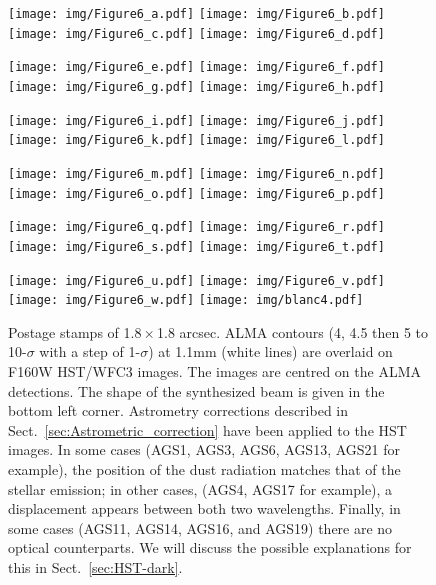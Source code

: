 \documentclass[longauth]{aa}
\begin{document}
\begin{figure*}
\centering

\begin{minipage}[t]{0.9\textwidth}
\resizebox{\hsize}{!} {
\texttt{[image: img/Figure6\_a.pdf]}
\texttt{[image: img/Figure6\_b.pdf]}
\texttt{[image: img/Figure6\_c.pdf]}
\texttt{[image: img/Figure6\_d.pdf]}
}
\end{minipage}
\begin{minipage}[t]{0.9\textwidth}
\resizebox{\hsize}{!} {
\texttt{[image: img/Figure6\_e.pdf]}
\texttt{[image: img/Figure6\_f.pdf]}
\texttt{[image: img/Figure6\_g.pdf]}
\texttt{[image: img/Figure6\_h.pdf]}
}
\end{minipage}

\begin{minipage}[t]{0.9\textwidth}
\resizebox{\hsize}{!} {
\texttt{[image: img/Figure6\_i.pdf]}
\texttt{[image: img/Figure6\_j.pdf]}
\texttt{[image: img/Figure6\_k.pdf]}
\texttt{[image: img/Figure6\_l.pdf]}
}
\end{minipage}
\begin{minipage}[t]{0.9\textwidth}
\resizebox{\hsize}{!} {
\texttt{[image: img/Figure6\_m.pdf]}
\texttt{[image: img/Figure6\_n.pdf]}
\texttt{[image: img/Figure6\_o.pdf]}
\texttt{[image: img/Figure6\_p.pdf]}
}
\end{minipage}
\begin{minipage}[t]{0.9\textwidth}
\resizebox{\hsize}{!} {
\texttt{[image: img/Figure6\_q.pdf]}
\texttt{[image: img/Figure6\_r.pdf]}
\texttt{[image: img/Figure6\_s.pdf]}
\texttt{[image: img/Figure6\_t.pdf]}
}
\end{minipage}
\begin{minipage}[t]{0.9\textwidth}
\resizebox{\hsize}{!} {

\texttt{[image: img/Figure6\_u.pdf]}
\texttt{[image: img/Figure6\_v.pdf]}
\texttt{[image: img/Figure6\_w.pdf]}
\texttt{[image: img/blanc4.pdf]}
}
\end{minipage}
\caption{Postage stamps of 1.8\,$\times$\,1.8 arcsec. ALMA contours (4, 4.5 then 5 to 10-$\sigma$ with a step of 1-$\sigma$) at 1.1mm (white lines) are overlaid on F160W HST/WFC3 images. The images are centred on the ALMA detections. The shape of the synthesized beam is given in the bottom left corner. Astrometry corrections described in Sect.~\ref{sec:Astrometric_correction} have been applied to the HST images. In some cases (AGS1, AGS3, AGS6, AGS13, AGS21 for example), the position of the dust radiation matches that of the stellar emission; in other cases, (AGS4, AGS17 for example), a displacement appears between both two wavelengths. Finally, in some cases (AGS11, AGS14, AGS16, and AGS19) there are no optical counterparts. We will discuss the possible explanations for this in Sect.~\ref{sec:HST-dark}.}
\label{ALMA_contours_H-band}
\end{figure*} 
\end{document}
